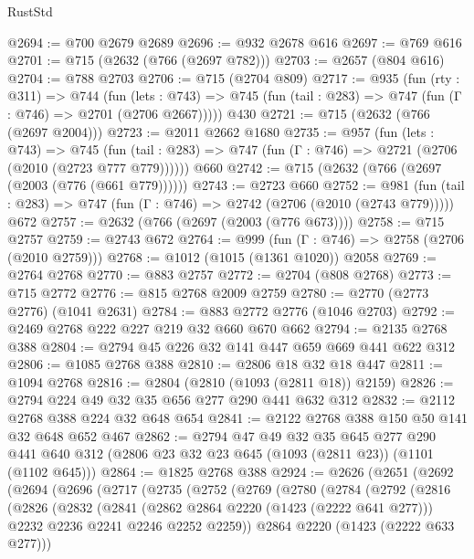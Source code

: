 \begin{lexlean}{RustStd}
\begin{coremodule}
@2694 := @700 @2679 @2689
@2696 := @932 @2678 @616
@2697 := @769 @616
@2701 := @715 (@2632 (@766 (@2697 @782)))
@2703 := @2657 (@804 @616)
@2704 := @788 @2703
@2706 := @715 (@2704 @809)
@2717 := @935
    (fun (rty : @311) =>
    @744
      (fun (lets : @743) =>
      @745 (fun (tail : @283) => @747 (fun (Γ : @746) => @2701 (@2706 @2667)))))
    @430
@2721 := @715 (@2632 (@766 (@2697 @2004)))
@2723 := @2011 @2662 @1680
@2735 := @957
    (fun (lets : @743) =>
    @745 (fun (tail : @283) => @747 (fun (Γ : @746) => @2721 (@2706 (@2010 (@2723 @777 @779))))))
    @660
@2742 := @715 (@2632 (@766 (@2697 (@2003 (@776 (@661 @779))))))
@2743 := @2723 @660
@2752 := @981
    (fun (tail : @283) => @747 (fun (Γ : @746) => @2742 (@2706 (@2010 (@2743 @779)))))
    @672
@2757 := @2632 (@766 (@2697 (@2003 (@776 @673))))
@2758 := @715 @2757
@2759 := @2743 @672
@2764 := @999 (fun (Γ : @746) => @2758 (@2706 (@2010 @2759)))
@2768 := @1012 (@1015 (@1361 @1020)) @2058
@2769 := @2764 @2768
@2770 := @883 @2757
@2772 := @2704 (@808 @2768)
@2773 := @715 @2772
@2776 := @815 @2768 @2009 @2759
@2780 := @2770 (@2773 @2776) (@1041 @2631)
@2784 := @883 @2772 @2776 (@1046 @2703)
@2792 := @2469 @2768 @222 @227 @219 @32 @660 @670 @662
@2794 := @2135 @2768 @388
@2804 := @2794 @45 @226 @32 @141 @447 @659 @669 @441 @622 @312
@2806 := @1085 @2768 @388
@2810 := @2806 @18 @32 @18 @447
@2811 := @1094 @2768
@2816 := @2804 (@2810 (@1093 (@2811 @18)) @2159)
@2826 := @2794 @224 @49 @32 @35 @656 @277 @290 @441 @632 @312
@2832 := @2112 @2768 @388 @224 @32 @648 @654
@2841 := @2122 @2768 @388 @150 @50 @141 @32 @648 @652 @467
@2862 := @2794
    @47
    @49
    @32
    @35
    @645
    @277
    @290
    @441
    @640
    @312
    (@2806 @23 @32 @23 @645 (@1093 (@2811 @23)) (@1101 (@1102 @645)))
@2864 := @1825 @2768 @388
@2924 := @2626
    (@2651
      (@2692
        (@2694
          (@2696
            (@2717
              (@2735
                (@2752
                  (@2769
                    (@2780
                      (@2784
                        (@2792
                          (@2816
                            (@2826
                              (@2832
                                (@2841
                                  (@2862 @2864 @2220 (@1423 (@2222 @641 @277)))
                                  @2232
                                  @2236
                                  @2241
                                  @2246
                                  @2252
                                  @2259))
                              @2864
                              @2220
                              (@1423 (@2222 @633 @277)))

\end{coremodule}
\end{lexlean}
